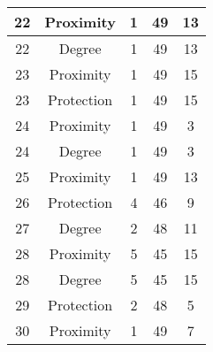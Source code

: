 \documentclass[results.tex]{subfiles}
\begin{document}
\begin{center}
\begin{tabular}{| c || c | c | c | c |}
            \hline
            22                      & Proximity                    & 1                      & 49                      & 13                   \\
            \hline
            22                      & Degree                       & 1                      & 49                      & 13                   \\
            \hline
            23                      & Proximity                    & 1                      & 49                      & 15                   \\
            \hline
            23                      & Protection                   & 1                      & 49                      & 15                   \\
            \hline
            24                      & Proximity                    & 1                      & 49                      & 3                    \\
            \hline
            24                      & Degree                       & 1                      & 49                      & 3                    \\
            \hline
            25                      & Proximity                    & 1                      & 49                      & 13                   \\
            \hline
            26                      & Protection                   & 4                      & 46                      & 9                    \\
            \hline
            27                      & Degree                       & 2                      & 48                      & 11                   \\
            \hline
            28                      & Proximity                    & 5                      & 45                      & 15                   \\
            \hline
            28                      & Degree                       & 5                      & 45                      & 15                   \\
            \hline
            29                      & Protection                   & 2                      & 48                      & 5                    \\
            \hline
            30                      & Proximity                    & 1                      & 49                      & 7                    \\

\end{tabular}
\end{center}
\end{document}
